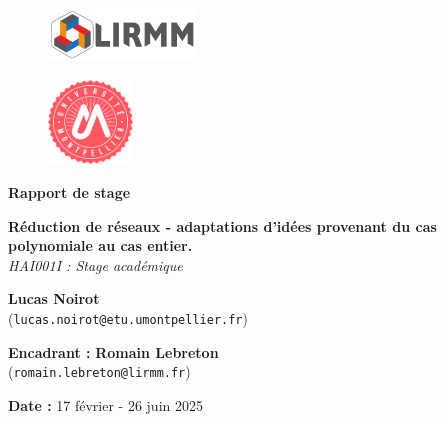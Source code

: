 \documentclass[a4paper,12pt]{report}  %
\theoremstyle{definitionstyle}
\theoremstyle{examplestyle}
\theoremstyle{remarkstyle}
\theoremstyle{propositionstyle}
\begin{document}
	
	\begin{titlepage}
		\begin{center}
			\begin{figure}[t]
				\centering
				\includegraphics[width=0.35\textwidth]{logo/logo_LIRMM.jpg} 
			\end{figure}
			\begin{figure}[t]
				\centering
				\includegraphics[width=0.2\textwidth]{logo/logo_univ_mpt.png} 
			\end{figure}
			
			\vspace{2cm}
			\Large{\textbf{Rapport de stage}}
			
			\vspace{0.5cm}
				
				 \Large{\textbf{Réduction de réseaux - adaptations d'idées provenant du cas polynomiale au cas entier.}} \\
			\vspace{0.5cm}
			\large{\textit{HAI001I : Stage académique}} \\
			
			\vspace{2cm}
			
			\large{
				\textbf{Lucas Noirot} \\
				(\texttt{lucas.noirot@etu.umontpellier.fr})
			}
			
			\vspace{1.5cm}
			
			\large{
				\textbf{Encadrant :} \textbf{Romain Lebreton} \\
				(\texttt{romain.lebreton@lirmm.fr})
			}
			
			\vspace{2cm}
			
			\normalsize{
				\textbf{Date :}  17 février - 26 juin 2025
			}
		\end{center}
	\end{titlepage}
	
\end{document}
